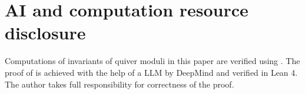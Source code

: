 \documentclass[11pt]{article}
\begin{document}
\section{AI and computation resource disclosure}\label{appendix:D}

Computations of invariants of quiver moduli in this paper are verified using \cite{quivertools}. The proof of  is achieved with the help of a LLM by DeepMind and verified in Lean 4. The author takes full responsibility for correctness of the proof.

\printbibliography[heading=bibintoc,title={References}]
\end{document}
